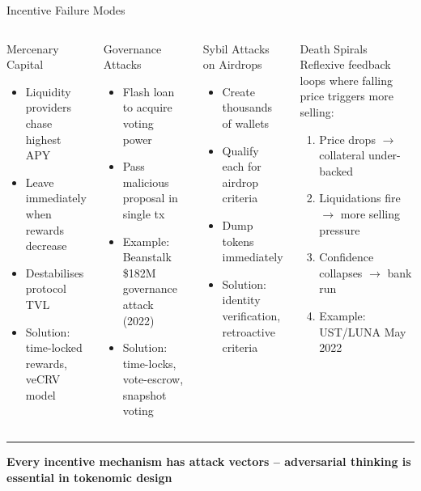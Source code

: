 \documentclass[8pt,aspectratio=169]{beamer}
\newcommand{\bottomnote}[1]{\vfill\vspace{-2mm}\textcolor{mllavender2}{\rule{\textwidth}{0.4pt}}\vspace{1mm}\footnotesize\textbf{#1}}
\begin{document}
\begin{frame}{Incentive Failure Modes}
\begin{columns}[T]
\begin{block}{Mercenary Capital}
\footnotesize
\begin{itemize}
  \item Liquidity providers chase highest APY
  \item Leave immediately when rewards decrease
  \item Destabilises protocol TVL
  \item Solution: time-locked rewards, veCRV model
\end{itemize}
\end{block}
\vspace{2mm}
\begin{block}{Governance Attacks}
\footnotesize
\begin{itemize}
  \item Flash loan to acquire voting power
  \item Pass malicious proposal in single tx
  \item Example: Beanstalk \$182M governance attack (2022)
  \item Solution: time-locks, vote-escrow, snapshot voting
\end{itemize}
\end{block}

\begin{block}{Sybil Attacks on Airdrops}
\footnotesize
\begin{itemize}
  \item Create thousands of wallets
  \item Qualify each for airdrop criteria
  \item Dump tokens immediately
  \item Solution: identity verification, retroactive criteria
\end{itemize}
\end{block}
\vspace{2mm}
\begin{alertblock}{\footnotesize Death Spirals}
\footnotesize
Reflexive feedback loops where falling price triggers more selling:
\begin{enumerate}
  \item Price drops $\rightarrow$ collateral under-backed
  \item Liquidations fire $\rightarrow$ more selling pressure
  \item Confidence collapses $\rightarrow$ bank run
  \item Example: UST/LUNA May 2022
\end{enumerate}
\end{alertblock}
\end{columns}
\bottomnote{Every incentive mechanism has attack vectors -- adversarial thinking is essential in tokenomic design}
\end{frame}
\end{document}
